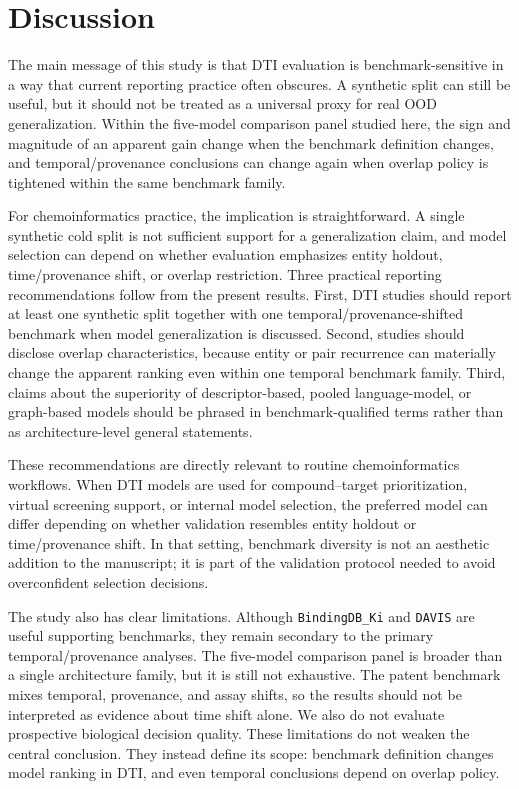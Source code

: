 \section{Discussion}

The main message of this study is that DTI evaluation is benchmark-sensitive in a way that current reporting practice often obscures. A synthetic split can still be useful, but it should not be treated as a universal proxy for real OOD generalization. Within the five-model comparison panel studied here, the sign and magnitude of an apparent gain change when the benchmark definition changes, and temporal/provenance conclusions can change again when overlap policy is tightened within the same benchmark family.

For chemoinformatics practice, the implication is straightforward. A single synthetic cold split is not sufficient support for a generalization claim, and model selection can depend on whether evaluation emphasizes entity holdout, time/provenance shift, or overlap restriction. Three practical reporting recommendations follow from the present results. First, DTI studies should report at least one synthetic split together with one temporal/provenance-shifted benchmark when model generalization is discussed. Second, studies should disclose overlap characteristics, because entity or pair recurrence can materially change the apparent ranking even within one temporal benchmark family. Third, claims about the superiority of descriptor-based, pooled language-model, or graph-based models should be phrased in benchmark-qualified terms rather than as architecture-level general statements.

These recommendations are directly relevant to routine chemoinformatics workflows. When DTI models are used for compound--target prioritization, virtual screening support, or internal model selection, the preferred model can differ depending on whether validation resembles entity holdout or time/provenance shift. In that setting, benchmark diversity is not an aesthetic addition to the manuscript; it is part of the validation protocol needed to avoid overconfident selection decisions.

The study also has clear limitations. Although \texttt{BindingDB\_Ki} and \texttt{DAVIS} are useful supporting benchmarks, they remain secondary to the primary temporal/provenance analyses. The five-model comparison panel is broader than a single architecture family, but it is still not exhaustive. The patent benchmark mixes temporal, provenance, and assay shifts, so the results should not be interpreted as evidence about time shift alone. We also do not evaluate prospective biological decision quality. These limitations do not weaken the central conclusion. They instead define its scope: benchmark definition changes model ranking in DTI, and even temporal conclusions depend on overlap policy.
